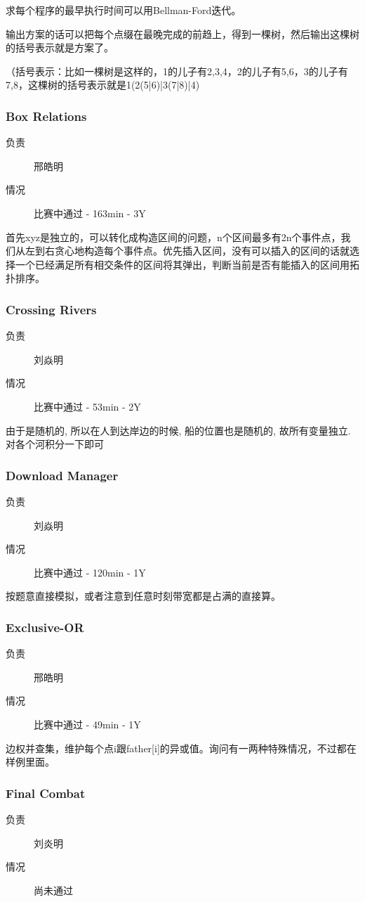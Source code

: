 \documentclass[a4paper, 11pt, nofonts, nocap, fancyhdr]{ctexart}
\newcommand{\problem}[1]{\subsubsection{#1}}
\begin{document}
求每个程序的最早执行时间可以用Bellman-Ford迭代。

输出方案的话可以把每个点缀在最晚完成的前趋上，得到一棵树，然后输出这棵树的括号表示就是方案了。

（括号表示：比如一棵树是这样的，1的儿子有2,3,4，2的儿子有5,6，3的儿子有7,8，这棵树的括号表示就是1(2(5|6)|3(7|8)|4)

\problem{Box Relations}

\begin{description}
\item[负责] 邢皓明
\item[情况] 比赛中通过 - 163min - 3Y
\end{description}

首先xyz是独立的，可以转化成构造区间的问题，n个区间最多有2n个事件点，我们从左到右贪心地构造每个事件点。优先插入区间，没有可以插入的区间的话就选择一个已经满足所有相交条件的区间将其弹出，判断当前是否有能插入的区间用拓扑排序。

\problem{Crossing Rivers}

\begin{description}
\item[负责] 刘焱明
\item[情况] 比赛中通过 - 53min - 2Y
\end{description}

由于是随机的, 所以在人到达岸边的时候, 船的位置也是随机的, 故所有变量独立. 对各个河积分一下即可

\problem{Download Manager}

\begin{description}
\item[负责] 刘焱明
\item[情况] 比赛中通过 - 120min - 1Y
\end{description}

按题意直接模拟，或者注意到任意时刻带宽都是占满的直接算。

\problem{Exclusive-OR}

\begin{description}
\item[负责] 邢皓明
\item[情况] 比赛中通过 - 49min - 1Y
\end{description}

边权并查集，维护每个点i跟father[i]的异或值。询问有一两种特殊情况，不过都在样例里面。

\problem{Final Combat}

\begin{description}
\item[负责] 刘炎明
\item[情况] 尚未通过
\end{description}
\end{document}
